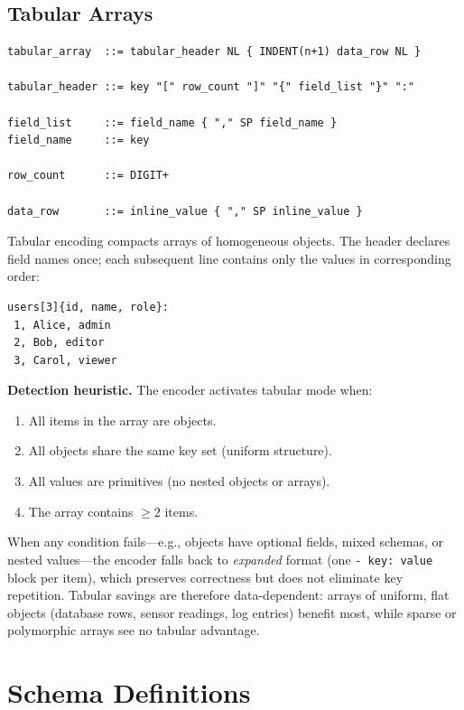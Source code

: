 \documentclass[11pt, a4paper]{article}
\begin{document}
\subsection{Tabular Arrays}
\label{sec:tabular-arrays}

\begin{lstlisting}[style=ebnf]
tabular_array  ::= tabular_header NL { INDENT(n+1) data_row NL }

tabular_header ::= key "[" row_count "]" "{" field_list "}" ":"

field_list     ::= field_name { "," SP field_name }
field_name     ::= key

row_count      ::= DIGIT+

data_row       ::= inline_value { "," SP inline_value }
\end{lstlisting}

\noindent Tabular encoding compacts arrays of homogeneous objects. The header
declares field names once; each subsequent line contains only the values
in corresponding order:

\begin{lstlisting}[style=scon]
users[3]{id, name, role}:
 1, Alice, admin
 2, Bob, editor
 3, Carol, viewer
\end{lstlisting}

\noindent \textbf{Detection heuristic.} The encoder activates tabular mode when:
\begin{enumerate}
\item All items in the array are objects.
\item All objects share the same key set (uniform structure).
\item All values are primitives (no nested objects or arrays).
\item The array contains $\geq 2$ items.
\end{enumerate}

\noindent When any condition fails---e.g., objects have optional fields,
mixed schemas, or nested values---the encoder falls back to
\emph{expanded} format (one \texttt{- key: value} block per item),
which preserves correctness but does not eliminate key repetition.
Tabular savings are therefore data-dependent: arrays of uniform,
flat objects (database rows, sensor readings, log entries) benefit
most, while sparse or polymorphic arrays see no tabular advantage.

\section{Schema Definitions}
\label{sec:schema-defs}
\end{document}
